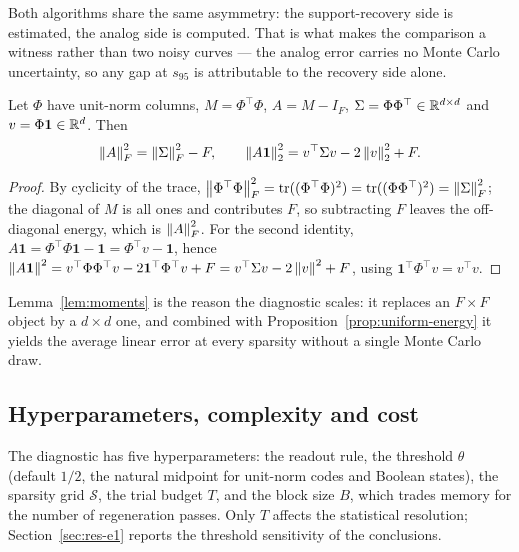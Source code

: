 Both algorithms share the same asymmetry: the support-recovery side is estimated, the analog
side is computed. That is what makes the comparison a witness rather than two noisy curves ---
the analog error carries no Monte Carlo uncertainty, so any gap at $s_{95}$ is attributable to
the recovery side alone.

\begin{lemma}
\label{lem:moments}
Let $\Phi$ have unit-norm columns, $M=\Phi^{\top}\Phi$, $A=M-I_F$,
$\Sigma=\Phi\Phi^{\top}\in\mathbb{R}^{d\times d}$ and $v=\Phi\mathbf 1\in\mathbb{R}^d$. Then
\[
  \left\lVert A \right\rVert_F^2=\left\lVert \Sigma \right\rVert_F^2-F,
  \qquad
  \left\lVert A\mathbf 1 \right\rVert_2^2=v^{\top}\Sigma v-2\left\lVert v \right\rVert_2^2+F .
\]
\end{lemma}

\begin{proof}
By cyclicity of the trace, $\left\lVert \Phi^{\top}\Phi \right\rVert_F^2=\operatorname{tr}((\Phi^{\top}\Phi)^2)
=\operatorname{tr}((\Phi\Phi^{\top})^2)=\left\lVert \Sigma \right\rVert_F^2$; the diagonal of $M$ is all ones and
contributes $F$, so subtracting $F$ leaves the off-diagonal energy, which is $\left\lVert A \right\rVert_F^2$.
For the second identity, $A\mathbf 1=\Phi^{\top}\Phi\mathbf 1-\mathbf 1=\Phi^{\top}v-\mathbf 1$,
hence $\left\lVert A\mathbf 1 \right\rVert^2=v^{\top}\Phi\Phi^{\top}v-2\mathbf 1^{\top}\Phi^{\top}v+F
=v^{\top}\Sigma v-2\left\lVert v \right\rVert^2+F$, using $\mathbf 1^{\top}\Phi^{\top}v=v^{\top}v$.
\end{proof}

Lemma~\ref{lem:moments} is the reason the diagnostic scales: it replaces an $F\times F$ object
by a $d\times d$ one, and combined with Proposition~\ref{prop:uniform-energy} it yields the
average linear error at every sparsity without a single Monte Carlo draw.

\subsection{Hyperparameters, complexity and cost}

The diagnostic has five hyperparameters: the readout rule, the threshold $\theta$ (default
$1/2$, the natural midpoint for unit-norm codes and Boolean states), the sparsity grid
$\mathcal S$, the trial budget $T$, and the block size $B$, which trades memory for the number
of regeneration passes. Only $T$ affects the statistical resolution;
Section~\ref{sec:res-e1} reports the threshold sensitivity of the conclusions.

